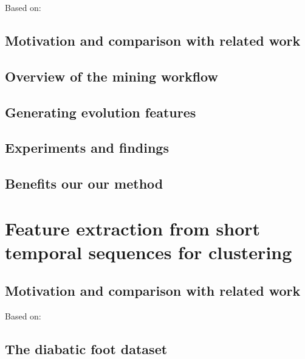 \documentclass[
]{book}
\begin{document}
Based on: \autocite{Niemann:CBMS2015}

\hypertarget{motivation-and-comparison-with-related-work-2}{%
\section{Motivation and comparison with related work}\label{motivation-and-comparison-with-related-work-2}}

\hypertarget{overview-of-the-mining-workflow}{%
\section{Overview of the mining workflow}\label{overview-of-the-mining-workflow}}

\hypertarget{generating-evolution-features}{%
\section{Generating evolution features}\label{generating-evolution-features}}

\hypertarget{experiments-and-findings-2}{%
\section{Experiments and findings}\label{experiments-and-findings-2}}

\hypertarget{benefits-our-our-method-1}{%
\section{Benefits our our method}\label{benefits-our-our-method-1}}

\hypertarget{diabfoot}{%
\chapter{Feature extraction from short temporal sequences for clustering}\label{diabfoot}}

\hypertarget{motivation-and-comparison-with-related-work-3}{%
\section{Motivation and comparison with related work}\label{motivation-and-comparison-with-related-work-3}}

Based on: \autocite{Niemann:CBMS2016,Niemann:PONE2016,Niemann:EBioMedicine2020}

\hypertarget{the-diabatic-foot-dataset}{%
\section{The diabatic foot dataset}\label{the-diabatic-foot-dataset}}
\end{document}
